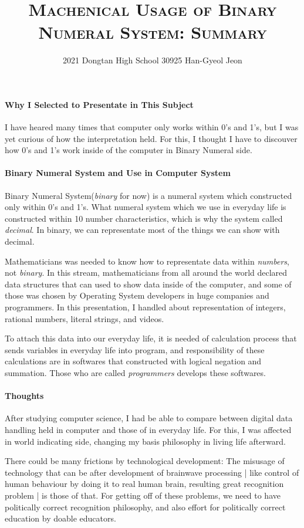 \documentclass{article}
\title{\textsc{Machenical Usage of Binary Numeral System: Summary}}
\author{2021 Dongtan High School 30925 Han-Gyeol Jeon}
\begin{document}
\maketitle

\paragraph{Why I Selected to Presentate in This Subject}
I have heared many times that computer only works within 0's and 1's,
but I was yet curious of how the interpretation held.
For this, I thought I have to discouver how 0's and 1's work inside of the computer
in Binary Numeral side.

\paragraph{Binary Numeral System and Use in Computer System}
Binary Numeral System(\textit{binary} for now) is a numeral system which
constructed only within 0's and 1's.
What numeral system which we use in everyday life is constructed within
10 number characteristics, which is why the system called \textit{decimal}.
In binary, we can representate most of the things we can show with decimal.

Mathematicians was needed to know how to representate data within
\textit{numbers}, not \textit{binary}.
In this stream, mathematicians from all around the world declared
data structures that can used to show data inside of the computer,
and some of those was chosen by Operating System developers in huge companies
and programmers.
In this presentation, I handled about representation of integers, rational numbers,
literal strings, and videos.

To attach this data into our everyday life, it is needed of calculation process that
sends variables in everyday life into program, and responsibility of these
calculations are in softwares that constructed with logical negation and summation.
Those who are called \textit{programmers} develops these softwares.

\paragraph{Thoughts}
After studying computer science,
I had be able to compare between digital data handling
held in computer and those of in everyday life. For this, I was affected in
world indicating side, changing my basis philosophy in living life afterward.

There could be many frictions by technological development:
The misusage of technology that can be after development of brainwave processing
| like control of human behaviour by doing it to real human brain, resulting great
recognition problem | is those of that.
For getting off of these problems, we need to have politically correct
recognition philosophy, and also effort for politically correct education by
doable educators.
\end{document}
